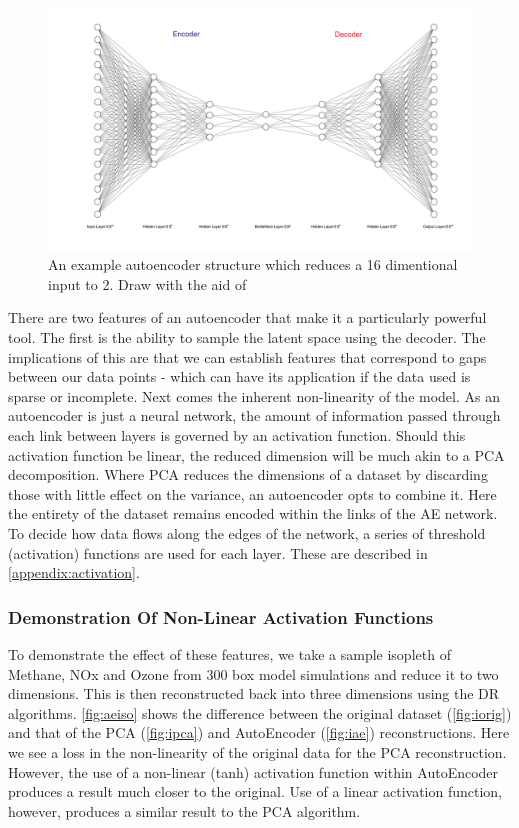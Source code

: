 \begin{figure}[H]
\includegraphics[width=\textwidth]{4fig/ae.pdf}
\caption{An example autoencoder structure which reduces a 16 dimentional input to 2. Draw with the aid of \citep{drawae}}
\end{figure}



There are two features of an autoencoder that make it a particularly powerful tool. The first is the ability to sample the latent space using the decoder. The implications of this are that we can establish features that correspond to gaps between our data points - which can have its application if the data used is sparse or incomplete. Next comes the inherent non-linearity of the model. As an autoencoder is just a neural network, the amount of information passed through each link between layers is governed by an activation function. Should this activation function be linear, the reduced dimension will be much akin to a PCA decomposition. Where PCA reduces the dimensions of a dataset by discarding those with little effect on the variance, an autoencoder opts to combine it. Here the entirety of the dataset remains encoded within the links of the AE network. To decide how data flows along the edges of the network, a series of threshold (activation) functions are used for each layer. These are described in \autoref{appendix:activation}.



\subsubsection{Demonstration Of Non-Linear Activation Functions}

To demonstrate the effect of these features, we take a sample isopleth of Methane, NOx and Ozone from 300 box model simulations and reduce it to two dimensions. This is then reconstructed back into three dimensions using the DR algorithms.
\autoref{fig:aeiso} shows the difference between the original dataset (\autoref{fig:iorig}) and that of the PCA (\autoref{fig:ipca}) and AutoEncoder (\autoref{fig:iae}) reconstructions. Here we see a loss in the non-linearity of the original data for the PCA reconstruction. However, the use of a non-linear (tanh) activation function within AutoEncoder produces a result much closer to the original. Use of a linear activation function, however, produces a similar result to the PCA algorithm.

